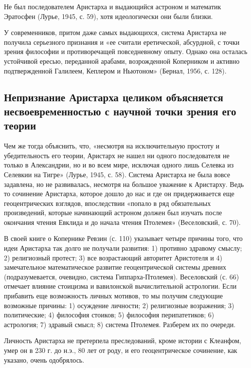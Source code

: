 Не  был последователем  Аристарха  и выдающийся  астроном и  математик
Эратосфен (Лурье, 1945, с. 59), хотя идеологически они были близки.

У современников,  притом даже  самых выдающихся, система  Аристарха не
получила серьезного признания и  «ее считали еретической, абсурдной, с
точки зрения  философии и  противоречащей повседневному  опыту. Однако
она  осталась  устойчивой  ересью,  переданной  арабами,  возрожденной
Коперником  и активно  подтвержденной Галилеем,  Кеплером и  Ньютоном»
(Бернал, 1956, с. 128).

\subsection{Непризнание       Аристарха      целиком       объясняется
несвоевременностью с научной точки зрения его теории}

Чем же  тогда объяснить, что,  «несмотря на исключительную  простоту и
убедительность его  теории, Аристарх не нашел  ни одного последователя
не  только в  Александрии, но  и во  всем мире,  исключая одного  лишь
Селевка из Селевкии на Тигре»  (Лурье, 1945, с. 58). Система Аристарха
не  была  вовсе задавлена,  но  не  развивалась, несмотря  на  большое
уважение к  Аристарху. Ведь то  сочинение Аристарха, которое  дошло до
нас и где он придерживается еще геоцентрических взглядов, впоследствии
«попало в  ряд обязательных произведений, которые  начинающий астроном
должен был изучать  после окончания чтения Евклида и  до начала чтения
Птолемея» (Веселовский, с. 70).

В своей  книге о  Копернике Ревзин (с.  110) указывает  четыре причины
того,  что  идеи   Аристарха  так  долго  не   получали  развития:  1)
противно здравому смыслу; 2)  религиозный протест; 3) все возрастающий
авторитет  Аристотеля  и   4)  замечательное  математическое  развитие
геоцентрической  системы древних  (подразумевается, очевидно,  система
Гиппарха-Птолемея). Веселовский  (с. 66) отмечает влияние  стоицизма и
вавилонской вычислительной астрологии.  Если прибавить еще возможность
личных  мотивов,  то  мы   получим  следующие  возможные  причины:  1)
осуждение  личности; 2)  религиозные возражения;  3) политические;  4)
философия  стоиков;  5)  философия перипатетиков;  6)  астрология;  7)
здравый смысл; 8) система Птолемея. Разберем их по очереди.

Личность  Аристарха  не  претерпела  преследований,  кроме  истории  с
Клеанфом,  умер  он  в  230  г.  до  н.э.,  80  лет  от  роду,  и  его
геоцентрическое сочинение, как указано, очень одобрялось.

